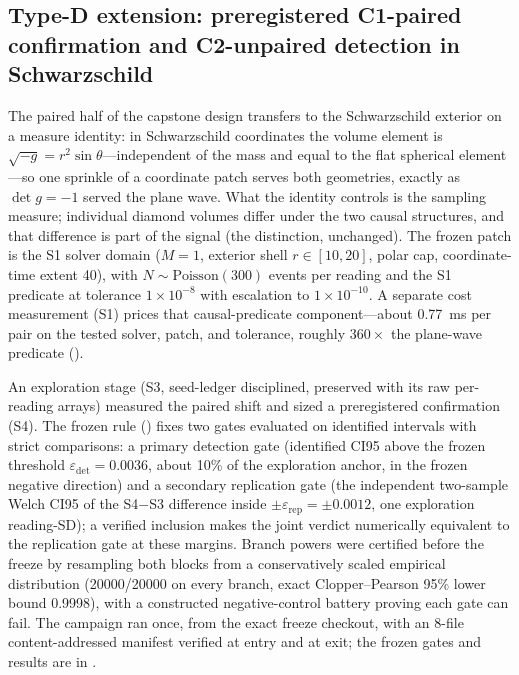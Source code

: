 \subsection{Type-D extension: preregistered C1-paired confirmation and C2-unpaired detection in Schwarzschild}\label{sec:schwarzschild}

The paired half of the capstone design transfers to the Schwarzschild
exterior on a measure identity: in Schwarzschild coordinates the volume
element is $\sqrt{-g} = r^2 \sin\theta$---independent of the mass and equal
to the flat spherical element---so one sprinkle of a coordinate patch serves
both geometries, exactly as $\det g = -1$ served the plane wave. What the
identity controls is the sampling measure; individual diamond volumes differ
under the two causal structures, and that difference is part of the signal
(the  distinction, unchanged). The frozen patch is the S1
solver domain ($M = 1$, exterior shell $r \in [10, 20]$, polar cap,
coordinate-time extent 40), with $N \sim \mathrm{Poisson}(300)$ events per
reading and the S1 predicate at tolerance $1\times10^{-8}$ with escalation
to $1\times10^{-10}$. A separate cost measurement (S1) prices that
causal-predicate component---about 0.77~ms per pair on the tested solver,
patch, and tolerance, roughly $360\times$ the plane-wave predicate
().

An exploration stage (S3, seed-ledger disciplined, preserved with its raw
per-reading arrays) measured the paired shift and sized a preregistered
confirmation (S4). The frozen rule
() fixes two gates
evaluated on identified intervals with strict comparisons: a primary
detection gate (identified CI95 above the frozen threshold
$\varepsilon_{\mathrm{det}} = 0.0036$, about 10\% of the exploration anchor,
in the frozen negative direction) and a secondary replication gate (the
independent two-sample Welch CI95 of the S4$-$S3 difference inside
$\pm\varepsilon_{\mathrm{rep}} = \pm 0.0012$, one exploration reading-SD); a
verified inclusion makes the joint verdict numerically equivalent to the
replication gate at these margins. Branch powers were certified before the
freeze by resampling both blocks from a conservatively scaled empirical
distribution (20000/20000 on every branch, exact Clopper--Pearson 95\% lower
bound 0.9998), with a constructed negative-control battery proving each gate
can fail. The campaign ran once, from the exact freeze checkout, with an
8-file content-addressed manifest verified at entry and at exit; the frozen
gates and results are in .


